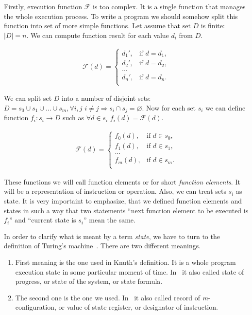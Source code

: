 \documentclass[oneside,a4paper]{article}  %
\newcommand{\Ra}{\Rightarrow}
\newcommand{\ra}{\rightarrow}
\newcommand{\term}[1]{\textit{#1}\index{#1}}
\newcommand{\altterm}[2]{\textit{#1}\index{#2}}
\begin{document}
Firstly, execution function $\mathcal{F}$ is too complex.
It is a single function that manages the whole execution process.
To write a program we should somehow split this function into set of more simple
functions.
Let assume that set $D$ is finite: $|D| = n$.
We can compute function result for each value $d_i$ from $D$.

\begin{align}
\mathcal{F}(d) =
    \begin{cases}
        d_1', & \text{if } d = d_1, \\
        d_2', & \text{if } d = d_2, \\
        \dots \\
        d_n', & \text{if } d = d_n. \\
    \end{cases}
\end{align}

We can split set $D$ into a number of disjoint sets:
$D = s_0 \cup s_1 \cup \dots \cup s_m,
    \forall i, j \,\, i \neq j \Ra s_i \cap s_j = \varnothing$.
Now for each set $s_i$ we can define function $f_i: s_i \ra D$ such as
$\forall d \in s_i \,\, f_i(d) = \mathcal{F}(d)$.

\begin{align}
\mathcal{F}(d) =
    \begin{cases}
        f_0(d), & \text{if } d \in s_0, \\
        f_1(d), & \text{if } d \in s_1, \\
        \dots \\
        f_m(d), & \text{if } d \in s_m. \\
    \end{cases}
\end{align}

These functions we will call function elements or
for short \altterm{function elements}{function element}.
It will be a representation of instruction or operation.
Also, we can treat sets $s_i$ as state.
It is very importaint to emphasize, that we defined function elements and
states in such a way that two statements
``next function element to be executed is $f_i$'' and
``current state is $s_i$'' mean the same.

In order to clarify what is meant by a term \term{state},
we have to turn to the definition of
Turing's machine~\cite{turing_computable_numbers}.
There are two different meanings.
\begin{enumerate}
    \item First meaning is the one used in Knuth's definition.
        It is a whole program execution state in some particular moment of
        time.
        In~\cite{turing_computable_numbers} it also called state of progress, 
        or state of the system, or state formula.
    \item The second one is the one we used.
        In~\cite{turing_computable_numbers} it also called 
        record of \textit{m}-configuration, or value of state register,
        or designator of instruction.
\end{enumerate}
\end{document}

